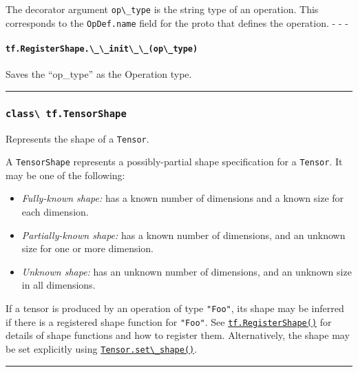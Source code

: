 The decorator argument \lstinline{op\_type} is the string type of an
operation. This corresponds to the \lstinline{OpDef.name} field for the
proto that defines the operation. - - -

\paragraph{\texorpdfstring{\lstinline{tf.RegisterShape.\_\_init\_\_(op\_type)}
}{tf.RegisterShape.\_\_init\_\_(op\_type) }}\label{tf.registershape.ux5fux5finitux5fux5fopux5ftype}

Saves the ``op\_type'' as the Operation type.

\begin{center}\rule{0.5\linewidth}{\linethickness}\end{center}

\subsubsection{\texorpdfstring{\lstinline{class\ tf.TensorShape}
}{class tf.TensorShape }}\label{class-tf.tensorshape}

Represents the shape of a \lstinline{Tensor}.

A \lstinline{TensorShape} represents a possibly-partial shape specification
for a \lstinline{Tensor}. It may be one of the following:

\begin{itemize}
\tightlist
\item
  \emph{Fully-known shape:} has a known number of dimensions and a known
  size for each dimension.
\item
  \emph{Partially-known shape:} has a known number of dimensions, and an
  unknown size for one or more dimension.
\item
  \emph{Unknown shape:} has an unknown number of dimensions, and an
  unknown size in all dimensions.
\end{itemize}

If a tensor is produced by an operation of type \lstinline{"Foo"}, its
shape may be inferred if there is a registered shape function for
\lstinline{"Foo"}. See
\href{../../api_docs/python/framework.md\#RegisterShape}{\lstinline{tf.RegisterShape()}}
for details of shape functions and how to register them. Alternatively,
the shape may be set explicitly using
\href{../../api_docs/python/framework.md\#Tensor.set_shape}{\lstinline{Tensor.set\_shape()}}.

\begin{center}\rule{0.5\linewidth}{\linethickness}\end{center}

